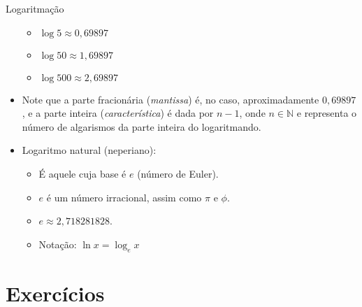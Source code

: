 \documentclass[14pt, aspectratio=169]{beamer}
\newcommand{\N}{\mathbb{N}}
\newcommand{\skipframe}{\vspace{10.0cm}}
\begin{document}
\begin{frame}[allowframebreaks]{Logaritmação}
\begin{itemize}
        \begin{itemize}
            \item $\log 5 \approx 0,69897$
            \item $\log 50 \approx 1,69897$
            \item $\log 500 \approx 2,69897$
        \end{itemize}

        \item Note que a parte fracionária (\emph{mantissa}) é, no caso, aproximadamente $0,69897$, e a parte inteira (\emph{característica}) é dada por $n - 1$, onde $n \in \N$ e representa o número de algarismos da parte inteira do logaritmando.

        \skipframe

        \item Logaritmo natural (neperiano):

        \begin{itemize}
            \item É aquele cuja base é $e$ (número de Euler).
            \item $e$ é um número irracional, assim como $\pi$ e $\phi$.
            \item $e \approx 2,718281828$.
            \item Notação: $\ln x = \log_e x$
        \end{itemize}
    \end{itemize}
\end{frame}

\section{Exercícios}
\end{document}

